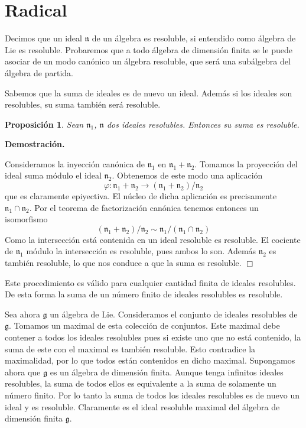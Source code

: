 \documentclass[a4paper,draft,12pt]{scrartcl}
\newtheorem{propo}[teo]{Proposición}%
\newcommand{\dem}{\noindent \textbf{Demostración. }\vspace{0.3 cm}}%
\newcommand{\g}{\mathfrak{g}}%
\newcommand{\fin}{ $\Box $ \vspace{0.4 cm}}
\newcommand{\lto}{\longrightarrow}%
\begin{document}
\newpage
\section{Radical}


Decimos que un ideal $\mathfrak{n}$ de un álgebra es resoluble, si entendido como álgebra de Lie es resoluble.  Probaremos que a todo álgebra de dimensión finita se le puede asociar de un modo canónico un álgebra resoluble, que será una subálgebra del álgebra de partida.

Sabemos que la suma de ideales es de nuevo un ideal.  Además si los ideales son resolubles, su suma también será resoluble.

\begin{propo}

Sean $\mathfrak{n}_1$, $ \mathfrak{n}$ dos ideales resolubles.  Entonces su suma es resoluble.

\end{propo}

\dem

Consideramos la inyección canónica de $\mathfrak{n}_1$ en $\mathfrak{n}_1+\mathfrak{n}_2$. Tomamos la proyección del ideal suma módulo el ideal $\mathfrak{n}_2$.  Obtenemos de este modo una aplicación
$$
\varphi: \mathfrak{n}_1+\mathfrak{n}_2\lto (\mathfrak{n}_1+\mathfrak{n}_2)/\mathfrak{n}_2
$$
que es claramente epiyectiva.  El núcleo de dicha aplicación es precisamente $\mathfrak{n}_1 \cap \mathfrak{n}_2$.  Por el teorema de factorización canónica tenemos entonces un isomorfismo
$$
(\mathfrak{n}_1+\mathfrak{n}_2)/\mathfrak{n}_2 \sim \mathfrak{n}_1/(\mathfrak{n}_1 \cap \mathfrak{n}_2)
$$
Como la intersección está contenida en un ideal resoluble es resoluble.  El cociente de $\mathfrak{n}_1$ módulo la intersección es resoluble, pues ambos lo son.  Además $\mathfrak{n}_2$ es también resoluble, lo que nos conduce a que la suma es resoluble.  \fin

Este procedimiento es válido para cualquier cantidad finita de ideales resolubles. De esta forma la suma de un número finito de ideales resolubles es resoluble.

Sea ahora $\g$ un álgebra de Lie.  Consideramos el conjunto de ideales resolubles de $\g$.  Tomamos un maximal de esta colección de conjuntos.  Este maximal debe contener a todos los ideales resolubles pues si existe uno que no está contenido, la suma de este con el maximal es también resoluble.  Esto contradice la maximalidad, por lo que todos están contenidos en dicho maximal. 
Supongamos ahora que $\g$ es un álgebra de dimensión finita.  Aunque tenga infinitos ideales resolubles, la suma de todos ellos es equivalente a la suma de solamente un número finito.  Por lo tanto la suma de todos los ideales resolubles es de nuevo un ideal y es resoluble.  Claramente es el ideal resoluble maximal del álgebra de dimensión finita $\g$.
\end{document}
